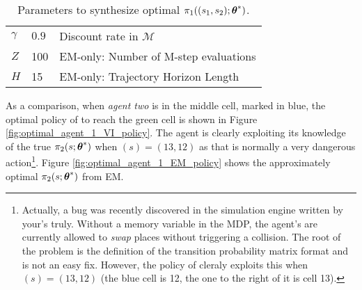 \begin{table}[H]
        \centering
        \begin{tabular}{l|l l}
                $\gamma$ & $0.9$ & Discount rate in $\mathcal{M}$ \\
                $Z$ & 100 & EM-only: Number of M-step evaluations \\
                $H$ & 15 & EM-only: Trajectory Horizon Length \\
        \end{tabular}
        \caption{Parameters to synthesize optimal $\pi_{1}((s_1,s_2);\boldsymbol{\mathbb{\theta}}^*)$.}
        \label{table:optimal_agent_1_EM_policy_params}
\end{table}
As a comparison, when \emph{agent two} is in the middle cell, marked in blue, the optimal policy of  to reach
the green cell is shown in Figure \ref{fig:optimal_agent_1_VI_policy}. The agent is clearly exploiting its knowledge of
the true $\pi_{2}(s;\boldsymbol{\mathbb{\theta}}^*)$ when $(s) = (13,12)$ as that is normally a very dangerous
action\footnote{Actually, a bug was recently discovered in the simulation engine written by your's truly. Without a
memory variable in the MDP, the agent's are currently allowed to \emph{swap} places without triggering a collision. The
root of the problem is the definition of the transition probability matrix format and is not an easy fix. However, the
policy of  cleraly exploits this when $(s) = (13,12)$ (the blue cell is 12, the one to the right of it is cell
13).}. Figure \ref{fig:optimal_agent_1_EM_policy} shows the approximately optimal $\pi_{2}(s;\boldsymbol{\mathbb{\theta}}^*)$
from EM.

    \begin{figure}[H]
        \begin{center}
        \end{center}
\end{figure}

    \begin{figure}[H]
        \begin{center}
        \end{center}
\end{figure}

